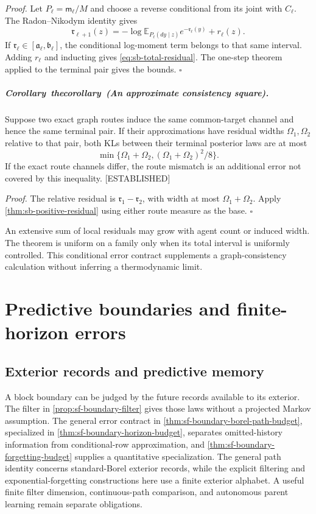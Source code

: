 \documentclass[11pt,letterpaper]{report}
\newcommand{\E}{\mathbb E}
\newcommand{\given}{\mid}
\newcounter{statementsequence}[chapter]
\newcommand{\syncstatementcounter}[1]{\stepcounter{statementsequence}\setcounter{#1}{\numexpr\value{statementsequence}-1\relax}\refstepcounter{#1}}
\newcommand{\resultheading}[4]{\syncstatementcounter{#2}\label{#4}\paragraph{#1~\csname the#2\endcsname\ (#3).}}
\newcommand{\corollaryheading}[2]{\resultheading{Corollary}{corollary}{#1}{#2}}
\newcommand{\status}[1]{\mbox{{\small\textsc{\textcolor{red!45!black}{[#1]}}}}}
\begin{document}
\noindent\emph{Proof.}
Let $P_\ell=\mathsf m_\ell/M$ and choose a reverse conditional from its joint with $C_\ell$. The Radon--Nikodym identity gives
\begin{equation}
{\mathfrak r}_{\ell+1}(z)
=-\log\E_{P_\ell(dy\given z)}e^{-{\mathfrak r}_\ell(y)}+r_\ell(z).
\label{eq:sb-error-recurrence}
\end{equation}
If ${\mathfrak r}_\ell\in[{\mathfrak a}_\ell,{\mathfrak b}_\ell]$, the conditional log-moment term belongs to that same interval. Adding $r_\ell$ and inducting gives \cref{eq:sb-total-residual}. The one-step theorem applied to the terminal pair gives the bounds. $\square$

\corollaryheading{An approximate consistency square}{cor:sb-route-error}
Suppose two exact graph routes induce the same common-target channel and hence the same terminal pair. If their approximations have residual widths $\Omega_1,\Omega_2$ relative to that pair, both KLs between their terminal posterior laws are at most
\begin{equation}
\min\{\Omega_1+\Omega_2,(\Omega_1+\Omega_2)^2/8\}.
\label{eq:sb-route-kl}
\end{equation}
If the exact route channels differ, the route mismatch is an additional error not covered by this inequality. \status{ESTABLISHED}

\noindent\emph{Proof.}
The relative residual is ${\mathfrak r}_1-{\mathfrak r}_2$, with width at most $\Omega_1+\Omega_2$. Apply \cref{thm:sb-positive-residual} using either route measure as the base. $\square$

An extensive sum of local residuals may grow with agent count or induced width. The theorem is uniform on a family only when its total interval is uniformly controlled. This conditional error contract supplements a graph-consistency calculation without inferring a thermodynamic limit.

\chapter{Predictive boundaries and finite-horizon errors}
\label{ch:sb-dynamics}
\section{Exterior records and predictive memory}
\label{sec:sf-boundary-predictive-memory}

A block boundary can be judged by the future records available to its exterior. The filter in \cref{prop:sf-boundary-filter} gives those laws without a projected Markov assumption. The general error contract in \cref{thm:sf-boundary-borel-path-budget}, specialized in \cref{thm:sf-boundary-horizon-budget}, separates omitted-history information from conditional-row approximation, and \cref{thm:sf-boundary-forgetting-budget} supplies a quantitative specialization. The general path identity concerns standard-Borel exterior records, while the explicit filtering and exponential-forgetting constructions here use a finite exterior alphabet. A useful finite filter dimension, continuous-path comparison, and autonomous parent learning remain separate obligations.
\end{document}
